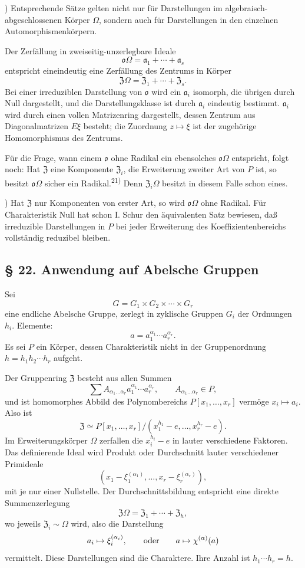 \documentclass[11pt]{article}
\providecommand{\mo}{\mathfrak{o}}
\providecommand{\ma}{\mathfrak{a}}
\providecommand{\mZ}{\mathfrak{Z}}
\begin{document}
{\footnotesize{}) Entsprechende Sätze gelten nicht nur für Darstellungen im algebraisch-abgeschlossenen Körper $\Omega$, sondern auch für Darstellungen in den einzelnen Automorphismenkörpern.\par}

Der Zerfällung in zweiseitig-unzerlegbare Ideale
\[
        \mo\Omega=\ma_1+\cdots+\ma_s
\]
entspricht eineindeutig eine Zerfällung des Zentrums in Körper
\[
        \mZ\Omega=\mZ_1+\cdots+\mZ_s.
\]
Bei einer irreduziblen Darstellung von $\mo$ wird ein $\ma_i$ isomorph, die übrigen durch Null dargestellt, und die Darstellungsklasse ist durch $\ma_i$ eindeutig bestimmt. $\ma_i$ wird durch einen vollen Matrizenring dargestellt, dessen Zentrum aus Diagonalmatrizen $E\xi$ besteht; die Zuordnung $z\mapsto\xi$ ist der zugehörige Homomorphismus des Zentrums.

Für die Frage, wann einem $\mo$ ohne Radikal ein ebensolches $\mo\Omega$ entspricht, folgt noch: Hat $\mZ$ eine Komponente $\mZ_i$, die Erweiterung zweiter Art von $P$ ist, so besitzt $\mo\Omega$ sicher ein Radikal.\textsuperscript{21)} Denn $\mZ_i\Omega$ besitzt in diesem Falle schon eines.

{\footnotesize{}) Hat $\mZ$ nur Komponenten von erster Art, so wird $\mo\Omega$ ohne Radikal. Für Charakteristik Null hat schon I. Schur den äquivalenten Satz bewiesen, daß irreduzible Darstellungen in $P$ bei jeder Erweiterung des Koeffizientenbereichs vollständig reduzibel bleiben.\par}

\subsection*{§ 22. Anwendung auf Abelsche Gruppen}
Sei
\[
        G=G_1\times G_2\times\cdots\times G_r
\]
eine endliche Abelsche Gruppe, zerlegt in zyklische Gruppen $G_i$ der Ordnungen $h_i$. Elemente:
\[
        a=a_1^{\alpha_1}\cdots a_r^{\alpha_r}.
\]
Es sei $P$ ein Körper, dessen Charakteristik nicht in der Gruppenordnung $h=h_1h_2\cdots h_r$ aufgeht.

Der Gruppenring $\mZ$ besteht aus allen Summen
\[
        \sum A_{\alpha_1\ldots\alpha_r}a_1^{\alpha_1}\cdots a_r^{\alpha_r},
        \qquad A_{\alpha_1\ldots\alpha_r}\in P,
\]
und ist homomorphes Abbild des Polynombereichs $P[x_1,\ldots,x_r]$ vermöge $x_i\mapsto a_i$. Also ist
\[
        \mZ\simeq P[x_1,\ldots,x_r]/(x_1^{h_1}-e,\ldots,x_r^{h_r}-e).
\]
Im Erweiterungskörper $\Omega$ zerfallen die $x_i^{h_i}-e$ in lauter verschiedene Faktoren. Das definierende Ideal wird Produkt oder Durchschnitt lauter verschiedener Primideale
\[
        (x_1-\xi_1^{(\alpha_1)},\ldots,x_r-\xi_r^{(\alpha_r)}),
\]
mit je nur einer Nullstelle. Der Durchschnittsbildung entspricht eine direkte Summenzerlegung
\[
        \mZ\Omega=\mZ_1+\cdots+\mZ_h,
\]
wo jeweils $\mZ_i\sim\Omega$ wird, also die Darstellung
\[
        a_i\mapsto \xi_i^{(\alpha_i)},
        \qquad\hbox{oder}\qquad a\mapsto \chi^{(\alpha)}(a)
\]
vermittelt. Diese Darstellungen sind die Charaktere. Ihre Anzahl ist $h_1\cdots h_r=h$.
\end{document}
